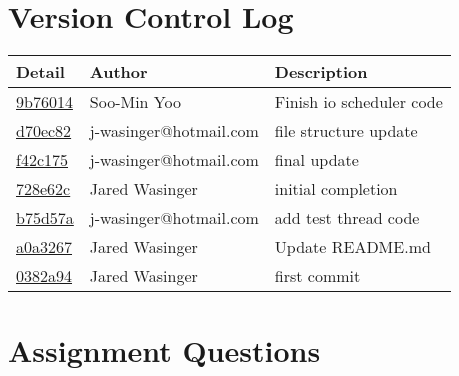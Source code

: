 \documentclass[letterpaper,10pt]{article}
\begin{document}
\section*{Version Control Log}
\begin{tabular}{l l l}\textbf{Detail} & \textbf{Author} & \textbf{Description}\\\hline
\href{https://github.com/jwasinger/dining_philosophers/commit/9b76014f69395c98157b04a237ab3d82ada934d3}{9b76014} & Soo-Min Yoo & Finish io scheduler code\\\hline
\href{https://github.com/jwasinger/dining_philosophers/commit/d70ec82da30610d01a50eab30ead5f4fcf2a6fdf}{d70ec82} & j-wasinger@hotmail.com & file structure update\\\hline
\href{https://github.com/jwasinger/dining_philosophers/commit/f42c175f974cb3ea4cda3f951d2f59c8b6f484c2}{f42c175} & j-wasinger@hotmail.com & final update\\\hline
\href{https://github.com/jwasinger/dining_philosophers/commit/728e62c00ca02bac0bcf25b7d216fcfd254be1d7}{728e62c} & Jared Wasinger & initial completion\\\hline
\href{https://github.com/jwasinger/dining_philosophers/commit/b75d57a18385302e88d5734280458ca1b4e0d409}{b75d57a} & j-wasinger@hotmail.com & add test thread code\\\hline
\href{https://github.com/jwasinger/dining_philosophers/commit/a0a32673f2d281f33ee749a069e84d241855d56d}{a0a3267} & Jared Wasinger & Update README.md\\\hline
\href{https://github.com/jwasinger/dining_philosophers/commit/0382a94abbc4caf3c97d9759a88fee730f39a5a0}{0382a94} & Jared Wasinger & first commit\\\hline
\end{tabular}

\section*{Assignment Questions}
\end{document}

